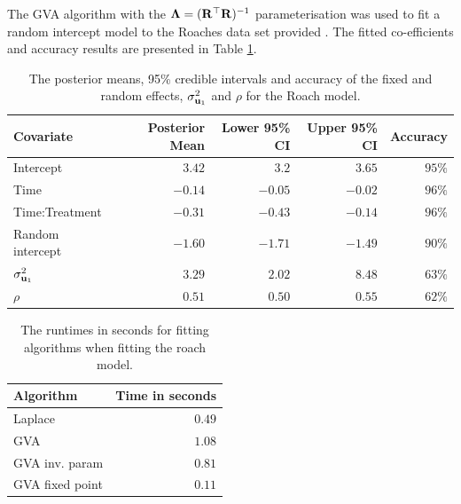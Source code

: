 The GVA algorithm with the ${\boldsymbol \Lambda} = ({\bf R}^\top {\bf R})^{-1}$ parameterisation
was used to fit a random intercept model to the Roaches data set provided
\cite{Gelman2007}. The fitted co-efficients and accuracy results are presented
in Table \ref{tab:application_roaches}.
		
		
		
\begin{table}
	\begin{tabular}{|l|rrrr|}
		\hline
		Covariate          & Posterior Mean & Lower 95\% CI & Upper 95\% CI & Accuracy \\
		\hline
		Intercept          & $3.42$						& $3.2$ 					& $3.65$          & $95\%$     \\
		Time               & $-0.14$        & $-0.05$       & $-0.02$       & $96\%$     \\
		Time:Treatment     & $-0.31$        & $-0.43$       & $-0.14$       & $96\%$     \\
		Random intercept   & $-1.60$        & $-1.71$       & $-1.49$       & $90\%$     \\
		$\sigma^2_{{\bf u}_1}$ & $3.29$           & $2.02$          & $8.48$          & $63\%$     \\
		$\rho$             & $0.51$           & $0.50$          & $0.55$          & $62\%$     \\
		\hline
	\end{tabular}
	\caption{The posterior means, 95\% credible intervals and accuracy of the fixed and random
						effects, $\sigma_{{\bf u}_1}^2$ and $\rho$ for the Roach model.}
	\label{tab:application_roaches}
\end{table}

\begin{table}
	\begin{tabular}{|lr|}
	\hline
	Algorithm & Time in seconds \\
	\hline
	Laplace & $0.49$ \\
	GVA & $1.08$ \\
	GVA inv. param & $0.81$ \\
	GVA fixed point & $0.11$ \\
	\hline
	\end{tabular}
	\label{tab:application_roaches_runtime}
	\caption{The runtimes in seconds for fitting algorithms when fitting the roach model.}
\end{table}
		

